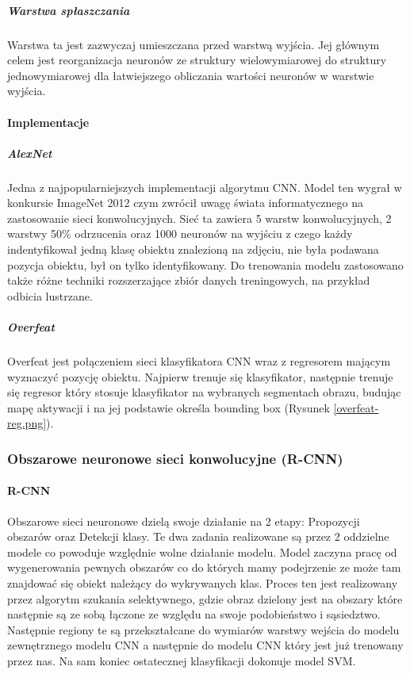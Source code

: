 \subparagraph{Warstwa spłaszczania}
Warstwa ta jest zazwyczaj umieszczana przed warstwą wyjścia. Jej głównym celem jest reorganizacja neuronów ze struktury wielowymiarowej do struktury jednowymiarowej dla łatwiejszego obliczania wartości neuronów w warstwie wyjścia.\cite{CNN-expl}

\paragraph{Implementacje}
\subparagraph{AlexNet}
Jedna z najpopularniejszych implementacji algorytmu CNN. Model ten wygrał w konkursie ImageNet 2012 czym zwrócił uwagę świata informatycznego na zastosowanie sieci konwolucyjnych.
Sieć ta zawiera 5 warstw konwolucyjnych, 2 warstwy 50\% odrzucenia oraz 1000 neuronów na wyjściu z czego każdy indentyfikował jedną klasę obiektu znalezioną na zdjęciu, nie była podawana pozycja obiektu, był on tylko identyfikowany. Do trenowania modelu zastosowano także różne techniki rozszerzające zbiór danych treningowych, na przykład odbicia lustrzane. \cite{AlexNet} \cite{ORdum-2}


\subparagraph{Overfeat}
Overfeat jest połączeniem sieci klasyfikatora CNN wraz z regresorem mającym wyznaczyć pozycję obiektu. Najpierw trenuje się klasyfikator, następnie trenuje się regresor który stosuje klasyfikator na wybranych segmentach obrazu, budując mapę aktywacji i na jej podstawie określa bounding box (Rysunek \ref{overfeat-reg.png}). \cite{Overfeat} \cite{ORdum-2}


\subsubsection{Obszarowe neuronowe sieci konwolucyjne (R-CNN)}

\paragraph{R-CNN}
Obszarowe sieci neuronowe dzielą swoje działanie na 2 etapy: Propozycji obszarów oraz Detekcji klasy. Te dwa zadania realizowane są przez 2 oddzielne modele co powoduje względnie wolne działanie modelu. Model zaczyna pracę od wygenerowania pewnych obszarów co do których mamy podejrzenie ze może tam znajdować się obiekt należący do wykrywanych klas. Proces ten jest realizowany przez algorytm szukania selektywnego, gdzie obraz dzielony jest na obszary które następnie są ze sobą łączone ze względu na swoje podobieństwo i sąsiedztwo.\cite{ORdum-1}  Następnie regiony te są przekształcane do wymiarów warstwy wejścia do modelu zewnętrznego modelu CNN a następnie do modelu CNN który jest już trenowany przez nas. Na sam koniec ostatecznej klasyfikacji dokonuje model SVM. \cite{ORdum-3}

